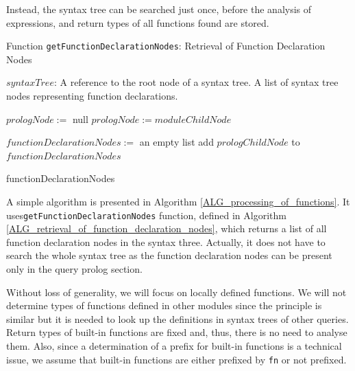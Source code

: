 Instead, the syntax tree can be searched just once, before the analysis of expressions, and return types of all functions found are stored.

\begin{algorithm}
\caption{Function \texttt{getFunctionDeclarationNodes}: Retrieval of Function Declaration Nodes}
\label{ALG_retrieval_of_function_declaration_nodes}
\begin{algorithmic}[1]
\REQUIRE $syntaxTree$: A reference to the root node of a syntax tree.
\ENSURE A list of syntax tree nodes representing function declarations.

\STATE $prologNode :=$ null
        \STATE $prologNode := moduleChildNode$
    \ENDIF
\ENDFOR

\STATE $functionDeclarationNodes :=$ an empty list
            \STATE add $prologChildNode$ to $functionDeclarationNodes$
        \ENDIF
    \ENDFOR
\ENDIF

\RETURN functionDeclarationNodes
\end{algorithmic}
\end{algorithm}

A simple algorithm is presented in Algorithm \ref{ALG_processing_of_functions}. It uses\linebreak \texttt{getFunctionDeclarationNodes} function, defined in Algorithm \ref{ALG_retrieval_of_function_declaration_nodes}, which returns a list of all function declaration nodes in the syntax three. Actually, it does not have to search the whole syntax tree as the function declaration nodes can be present only in the query prolog section. 

Without loss of generality, we will focus on locally defined functions. We will not determine types of functions defined in other modules since the principle is similar but it is needed to look up the definitions in syntax trees of other queries. Return types of built-in functions are fixed and, thus, there is no need to analyse them. Also, since a determination of a prefix for built-in functions is a technical issue, we assume that built-in functions are either prefixed by \texttt{fn} or not prefixed.

